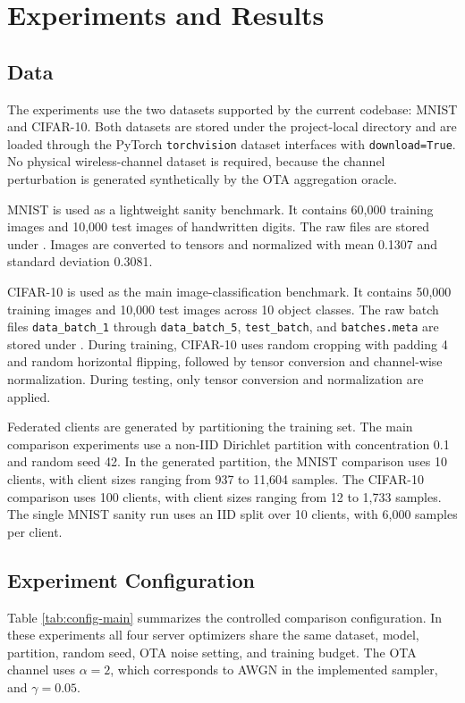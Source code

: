 \chapter{Experiments and Results}

\section{Data}
The experiments use the two datasets supported by the current codebase:
MNIST and CIFAR-10. Both datasets are stored under the project-local
 directory and are loaded through the PyTorch \texttt{torchvision}
dataset interfaces with \texttt{download=True}. No physical wireless-channel
dataset is required, because the channel perturbation is generated
synthetically by the OTA aggregation oracle.

MNIST is used as a lightweight sanity benchmark. It contains 60,000 training
images and 10,000 test images of handwritten digits. The raw files are stored
under . Images are converted to tensors and normalized
with mean 0.1307 and standard deviation 0.3081.

CIFAR-10 is used as the main image-classification benchmark. It contains
50,000 training images and 10,000 test images across 10 object classes. The
raw batch files \texttt{data\_batch\_1} through \texttt{data\_batch\_5},
\texttt{test\_batch}, and \texttt{batches.meta} are stored under
. During training, CIFAR-10 uses random
cropping with padding 4 and random horizontal flipping, followed by tensor
conversion and channel-wise normalization. During testing, only tensor
conversion and normalization are applied.

Federated clients are generated by partitioning the training set. The main
comparison experiments use a non-IID Dirichlet partition with concentration
0.1 and random seed 42. In the generated partition, the MNIST comparison uses
10 clients, with client sizes ranging from 937 to 11,604 samples. The CIFAR-10
comparison uses 100 clients, with client sizes ranging from 12 to 1,733
samples. The single MNIST sanity run uses an IID split over 10 clients, with
6,000 samples per client.

\section{Experiment Configuration}
Table \ref{tab:config-main} summarizes the controlled comparison
configuration. In these experiments all four server optimizers share the same
dataset, model, partition, random seed, OTA noise setting, and training
budget. The OTA channel uses $\alpha=2$, which corresponds to AWGN in the
implemented sampler, and $\gamma=0.05$.

